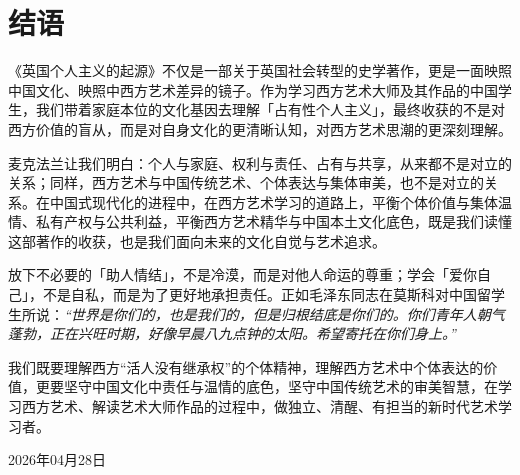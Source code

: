 \documentclass[12pt,a4paper]{article}
\begin{document}
\section*{结语}
《英国个人主义的起源》不仅是一部关于英国社会转型的史学著作，更是一面映照中国文化、映照中西方艺术差异的镜子。作为学习西方艺术大师及其作品的中国学生，我们带着家庭本位的文化基因去理解「占有性个人主义」，最终收获的不是对西方价值的盲从，而是对自身文化的更清晰认知，对西方艺术思潮的更深刻理解。

麦克法兰让我们明白：个人与家庭、权利与责任、占有与共享，从来都不是对立的关系；同样，西方艺术与中国传统艺术、个体表达与集体审美，也不是对立的关系。在中国式现代化的进程中，在西方艺术学习的道路上，平衡个体价值与集体温情、私有产权与公共利益，平衡西方艺术精华与中国本土文化底色，既是我们读懂这部著作的收获，也是我们面向未来的文化自觉与艺术追求。

放下不必要的「助人情结」，不是冷漠，而是对他人命运的尊重；学会「爱你自己」，不是自私，而是为了更好地承担责任。正如毛泽东同志在莫斯科对中国留学生所说：\textit{“世界是你们的，也是我们的，但是归根结底是你们的。你们青年人朝气蓬勃，正在兴旺时期，好像早晨八九点钟的太阳。希望寄托在你们身上。”}

我们既要理解西方“活人没有继承权”的个体精神，理解西方艺术中个体表达的价值，更要坚守中国文化中责任与温情的底色，坚守中国传统艺术的审美智慧，在学习西方艺术、解读艺术大师作品的过程中，做独立、清醒、有担当的新时代艺术学习者。

\vspace{2em}
\hfill 2026年04月28日
\end{document}
